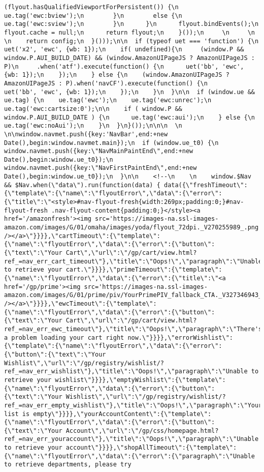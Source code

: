 \documentclass[
]{article}
\begin{document}
\begin{verbatim}
(flyout.hasQualifiedViewportForPersistent()) {\n          ue.tag('ewc:bview');\n        }\n        else {\n          ue.tag('ewc:sview');\n        }\n      }\n      flyout.bindEvents();\n      flyout.cache = null;\n      return flyout;\n    }());\n     \n     \n     \n    return config;\n  }()));\n\n  if (typeof uet === 'function') {\n    uet('x2', 'ewc', {wb: 1});\n    if( undefined){\n     (window.P && window.P.AUI_BUILD_DATE) && (window.AmazonUIPageJS ? AmazonUIPageJS : P)\n     .when('atf').execute(function() {\n      uet('bb', 'ewc', {wb: 1});\n    });\n    } else {\n    (window.AmazonUIPageJS ? AmazonUIPageJS : P).when('navCF').execute(function() {\n      uet('bb', 'ewc', {wb: 1});\n    });\n    }\n  }\n\n  if (window.ue && ue.tag) {\n    ue.tag('ewc');\n    ue.tag('ewc:unrec');\n    ue.tag('ewc:cartsize:0');\n\n    if ( window.P && window.P.AUI_BUILD_DATE ) {\n      ue.tag('ewc:aui');\n    } else {\n      ue.tag('ewc:noAui');\n    }\n  }\n}());\n\n\n  \n  \n\nwindow.navmet.push({key:'NavBar',end:+new Date(),begin:window.navmet.main});\n  if (window.ue_t0) {\n    window.navmet.push({key:\"NavMainPaintEnd\",end:+new Date(),begin:window.ue_t0});\n    window.navmet.push({key:\"NavFirstPaintEnd\",end:+new Date(),begin:window.ue_t0});\n  }\n\n    <!--\n    \n    window.$Nav && $Nav.when(\"data\").run(function(data) { data({\"freshTimeout\":{\"template\":{\"name\":\"flyoutError\",\"data\":{\"error\":{\"title\":\"<style>#nav-flyout-fresh{width:269px;padding:0;}#nav-flyout-fresh .nav-flyout-content{padding:0;}</style><a href='/amazonfresh'><img src='https://images-na.ssl-images-amazon.com/images/G/01/omaha/images/yoda/flyout_72dpi._V270255989_.png' /></a>\"}}}},\"cartTimeout\":{\"template\":{\"name\":\"flyoutError\",\"data\":{\"error\":{\"button\":{\"text\":\"Your Cart\",\"url\":\"/gp/cart/view.html?ref_=nav_err_cart_timeout\"},\"title\":\"Oops!\",\"paragraph\":\"Unable to retrieve your cart.\"}}}},\"primeTimeout\":{\"template\":{\"name\":\"flyoutError\",\"data\":{\"error\":{\"title\":\"<a href='/gp/prime'><img src='https://images-na.ssl-images-amazon.com/images/G/01/prime/piv/YourPrimePIV_fallback_CTA._V327346943_.jpg' /></a>\"}}}},\"ewcTimeout\":{\"template\":{\"name\":\"flyoutError\",\"data\":{\"error\":{\"button\":{\"text\":\"Your Cart\",\"url\":\"/gp/cart/view.html?ref_=nav_err_ewc_timeout\"},\"title\":\"Oops!\",\"paragraph\":\"There's a problem loading your cart right now.\"}}}},\"errorWishlist\":{\"template\":{\"name\":\"flyoutError\",\"data\":{\"error\":{\"button\":{\"text\":\"Your Wishlist\",\"url\":\"/gp/registry/wishlist/?ref_=nav_err_wishlist\"},\"title\":\"Oops!\",\"paragraph\":\"Unable to retrieve your wishlist\"}}}},\"emptyWishlist\":{\"template\":{\"name\":\"flyoutError\",\"data\":{\"error\":{\"button\":{\"text\":\"Your Wishlist\",\"url\":\"/gp/registry/wishlist/?ref_=nav_err_empty_wishlist\"},\"title\":\"Oops!\",\"paragraph\":\"Your list is empty\"}}}},\"yourAccountContent\":{\"template\":{\"name\":\"flyoutError\",\"data\":{\"error\":{\"button\":{\"text\":\"Your Account\",\"url\":\"/gp/css/homepage.html?ref_=nav_err_youraccount\"},\"title\":\"Oops!\",\"paragraph\":\"Unable to retrieve your account\"}}}},\"shopAllTimeout\":{\"template\":{\"name\":\"flyoutError\",\"data\":{\"error\":{\"paragraph\":\"Unable to retrieve departments, please try 
\end{verbatim}
\end{document}
